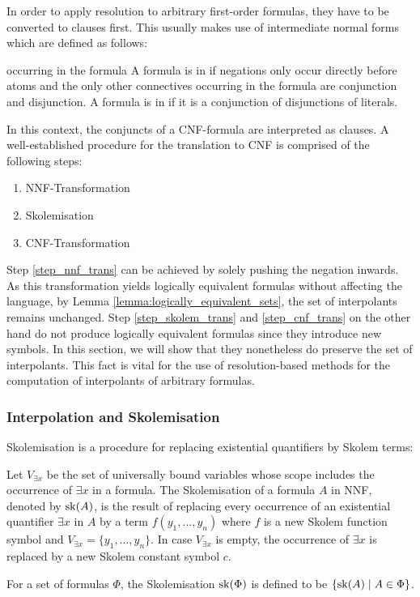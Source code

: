 In order to apply resolution to arbitrary first-order formulas, they have to be converted to clauses first.
This usually makes use of intermediate normal forms which are defined as follows:

\begin{defi}
	occurring in the formula A formula is in  if negations only occur directly before atoms and the only other connectives occurring in the formula are conjunction and disjunction.
	A formula is in  if it is a conjunction of disjunctions of literals.
\end{defi}

In this context, the conjuncts of a CNF-formula are interpreted as clauses.
A well-established procedure for the translation to CNF is comprised of the following steps:

\begin{enumerate}
	\item NNF-Transformation \label{step_nnf_trans}
	\item Skolemisation \label{step_skolem_trans}
	\item CNF-Transformation \label{step_cnf_trans}
\end{enumerate}

Step \ref{step_nnf_trans} can be achieved by solely pushing the negation inwards.
As this transformation yields logically equivalent formulas without affecting the language, by Lemma \ref{lemma:logically_equivalent_sets}, the set of interpolants remains unchanged.
Step \ref{step_skolem_trans} and \ref{step_cnf_trans} on the other hand do not produce logically equivalent formulas since they introduce new symbols.
In this section, we will show that they nonetheless do preserve the set of interpolants.
This fact is vital for the use of resolution-based methods for the computation of interpolants of arbitrary formulas.


\subsubsection{Interpolation and Skolemisation}

Skolemisation is a procedure for replacing existential quantifiers by Skolem terms:

\begin{defi}
	Let $V_{\exists x}$ be the set of universally bound variables whose scope includes
	the occurrence of $\exists x$ in a formula.
	The Skolemisation of a formula $A$ in NNF, denoted by $\operatorname{sk}(A)$, is the result of replacing every occurrence of an existential quantifier $\exists x$ in $A$ by a term $f(y_1, \ldots, y_n)$ where $f$ is a new Skolem function symbol and $V_{\exists x} = \{y_1, \ldots, y_n\}$.
	In case $V_{\exists x}$ is empty, the occurrence of $\exists x$ is replaced by a new Skolem constant symbol $c$.

	For a set of formulas $\Phi$, the Skolemisation $\operatorname{sk}(\Phi)$ is defined to be $\{ \sk(A) \mid A \in\nolinebreak \Phi \}$.
\end{defi}

